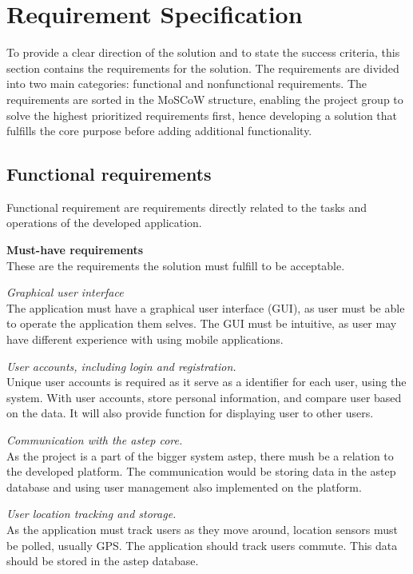 \section{Requirement Specification}
To provide a clear direction of the solution and to state the success criteria, this section contains the requirements for the solution. 
The requirements are divided into two main categories: functional and nonfunctional requirements. 
The requirements are sorted in the MoSCoW structure, enabling the project group to solve the highest prioritized requirements first, hence developing a solution that fulfills the core purpose before adding additional functionality.


\subsection{Functional requirements}
Functional requirement are requirements directly related to the tasks and operations of the developed application.

\textbf{Must-have requirements}\\
These are the requirements the solution must fulfill to be acceptable.

\textit{Graphical user interface}\\
The application must have a graphical user interface (GUI), as user must be able to operate the application them selves. 
The GUI must be intuitive, as user may have different experience with using mobile applications.

\textit{User accounts, including login and registration.}\\
Unique user accounts is required as it serve as a identifier for each user, using the system. With user accounts, store personal information, and compare user based on the data. 
It will also provide function for displaying user to other users.

\textit{Communication with the \gls{astep} core.}\\
As the project is a part of the bigger system \gls{astep}, there mush be a relation to the developed platform. 
The communication would be storing data in the \gls{astep} database and using user management also implemented on the platform.

\textit{User location tracking and storage.}\\
As the application must track users as they move around, location sensors must be polled, usually GPS. 
The application should track users commute.
This data should be stored in the \gls{astep} database.

